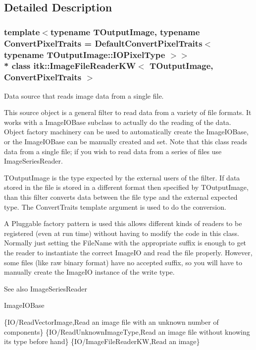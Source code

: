 \subsection{Detailed Description}
\subsubsection*{template$<$typename T\+Output\+Image, typename Convert\+Pixel\+Traits = Default\+Convert\+Pixel\+Traits$<$                    typename T\+Output\+Image\+::\+I\+O\+Pixel\+Type $>$$>$\\*
class itk\+::\+Image\+File\+Reader\+K\+W$<$ T\+Output\+Image, Convert\+Pixel\+Traits $>$}

Data source that reads image data from a single file. 

This source object is a general filter to read data from a variety of file formats. It works with a Image\+I\+O\+Base subclass to actually do the reading of the data. Object factory machinery can be used to automatically create the Image\+I\+O\+Base, or the Image\+I\+O\+Base can be manually created and set. Note that this class reads data from a single file; if you wish to read data from a series of files use Image\+Series\+Reader.

T\+Output\+Image is the type expected by the external users of the filter. If data stored in the file is stored in a different format then specified by T\+Output\+Image, than this filter converts data between the file type and the external expected type. The Convert\+Traits template argument is used to do the conversion.

A Pluggable factory pattern is used this allows different kinds of readers to be registered (even at run time) without having to modify the code in this class. Normally just setting the File\+Name with the appropriate suffix is enough to get the reader to instantiate the correct Image\+IO and read the file properly. However, some files (like raw binary format) have no accepted suffix, so you will have to manually create the Image\+IO instance of the write type.

\begin{DoxySeeAlso}{See also}
Image\+Series\+Reader 

Image\+I\+O\+Base
\end{DoxySeeAlso}
\{I\+O/\+Read\+Vector\+Image,Read an image file with an unknown number of components\} \{I\+O/\+Read\+Unknown\+Image\+Type,Read an image file without knowing its type before hand\} \{I\+O/\+Image\+File\+Reader\+KW,Read an image\}  

